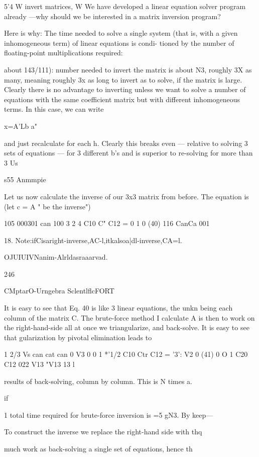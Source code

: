 {{{{{{{{5'4 W invert matrices, W
We have developed a linear equation solver program already
—why should we be interested in a matrix inversion program?

Here is why: The time needed to solve a single system (that is,
with a given inhomogeneous term) of linear equations is condi-
tioned by the number of floating-point multiplications required:

about 143/111): number needed to invert the matrix is about N3,
roughly 3X as many, meaning roughly 3x as long to invert as to
solve, if the matrix is large. Clearly there is no advantage to
inverting unless we want to solve a number of equations with the
same coefficient matrix but with different inhomogeneous terms.
In this case, we can write

x=A'Lb a"

and just recalculate for each h. Clearly this breaks even — relative
to solving 3 sets of equations — for 3 different b's and is superior
to re-solving for more than 3 Us

s55 Anmmpie

Let us now calculate the inverse of our 3x3 matrix from before.
The equation is (let c = A " be the inverse")

105 000301 can 100
3 2 4 C10 C" C12 = 0 1 0 (40)
116 CanCa 001

 

18. Note:ifCisaright-inverse,AC-l,itkalsoa|dl-inverse,CA=l.

OJUIUIVNanim-Alrldasraaarvad.

246

CMptarO-Urngebra SclentlflcFORT

It is easy to see that Eq. 40 is like 3 linear equations, the unkn
being each column of the matrix C. The brute-force method I
calculate A is then to work on the right-hand-side all at once
we triangularize, and back-solve. It is easy to see that
gularization by pivotal elimination leads to

1 2/3 Vs can cat can 0 V3 0
0 1 *'1/2 C10 Ctr C12 = '3': V2 0 (41)
0 O 1 C20 C12 022 V13 "V13  13 l

results of back-solving, column by column. This is N times a.

if

1
total time required for brute-force inversion is =5 gN3. By keep—

To construct the inverse we replace the right-hand side with thq

much work as back-solving a single set of equations, hence th

}}}}}}}}
